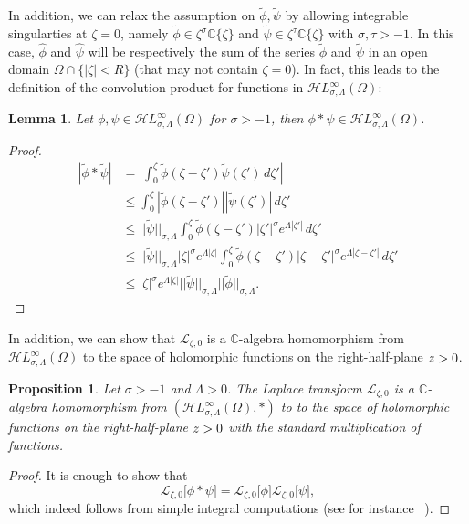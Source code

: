 \documentclass{article}
\let\Re\relax
\DeclareMathOperator{\Re}{Re}
\newcommand{\singexp}[2]{\mathcal{H}L^\infty_{#1, #2}}
\newcommand{\C}{\mathbb{C}}
\newcommand{\series}[1]{\tilde{#1}}
\newcommand{\laplace}{\mathcal{L}}
\theoremstyle{definition}
\theoremstyle{plain}
\newtheorem{prop}[definition]{Proposition}
\newtheorem{lemma}[definition]{Lemma}
\newenvironment{verify}{\color{ForestGreen}}{\color{black}}
\begin{document}
In addition, we can relax the assumption on $\series{\phi},\series{\psi}$ by allowing integrable singularties at $\zeta=0$, namely  $\series{\phi}\in\zeta^{\sigma}\C\lbrace\zeta\rbrace$ and $\series{\psi}\in\zeta^{\tau}\C\lbrace\zeta\rbrace$ with $\sigma,\tau>-1$. In this case, $\hat{\phi}$ and $\hat{\psi}$ will be respectively the sum of the series $\series{\phi}$ and $\series{\psi}$ in an open domain $\Omega\cap \lbrace |\zeta|<R\rbrace$ (that may not contain $\zeta=0$). In fact, this leads to the definition of the convolution product for functions in $\singexp{\sigma}{\Lambda}(\Omega)$: 
\begin{lemma}
    Let $\phi,\psi\in\singexp{\sigma}{\Lambda}(\Omega)$ for $\sigma>-1$, then $\phi\ast\psi\in\singexp{\sigma}{\Lambda}(\Omega)$.
\end{lemma}
\begin{verify}
\begin{proof}
    \begin{align*}
        | \tilde{\phi}\ast\tilde{\psi}|&=\left|\int_0^\zeta\tilde{\phi}(\zeta-\zeta')\tilde{\psi}(\zeta')\, d\zeta'\right|\\
        &\le \int_0^\zeta |\tilde{\phi}(\zeta-\zeta')||\tilde{\psi}(\zeta')|\, d\zeta'\\
        &\le ||\tilde{\psi}||_{\sigma,\Lambda} \int_0^\zeta\tilde{\phi}(\zeta-\zeta')|\zeta'|^{\sigma}e^{\Lambda|\zeta'|}\, d\zeta'\\
        &\le ||\tilde{\psi}||_{\sigma,\Lambda} |\zeta|^{\sigma}e^{\Lambda|\zeta|} \int_0^\zeta\tilde{\phi}(\zeta-\zeta')|\zeta-\zeta'|^{\sigma}e^{\Lambda|\zeta-\zeta'|}\, d\zeta'\\
        &\le |\zeta|^{\sigma}e^{\Lambda|\zeta|} ||\tilde{\psi}||_{\sigma,\Lambda} ||\tilde{\phi}||_{\sigma,\Lambda}. 
    \end{align*}
\end{proof}
\end{verify}
In addition, we can show that $\laplace_{\zeta,0}$ is a $\C$-algebra homomorphism from $\singexp{\sigma}{\Lambda}(\Omega)$ to the space of holomorphic functions on the right-half-plane $\Re z>0$. 
\begin{prop}
    Let $\sigma>-1$ and $\Lambda>0$. The Laplace transform $\laplace_{\zeta,0}$ is a $\C$-algebra homomorphism from $(\singexp{\sigma}{\Lambda}(\Omega), \ast)$ to to the space of holomorphic functions on the right-half-plane $\Re z>0$ with the standard multiplication of functions. 
\end{prop}
\begin{proof}
It is enough to show that
\[\laplace_{\zeta,0}\big[{\phi}\ast{\psi}\big]=\laplace_{\zeta,0}\big[{\phi}\big]\laplace_{\zeta,0}\big[{\psi}\big],\]
which indeed follows from simple integral computations (see for instance ~\cite[Theorem 2.39]{laplace-tfm}). 
\end{proof}
\end{document}
